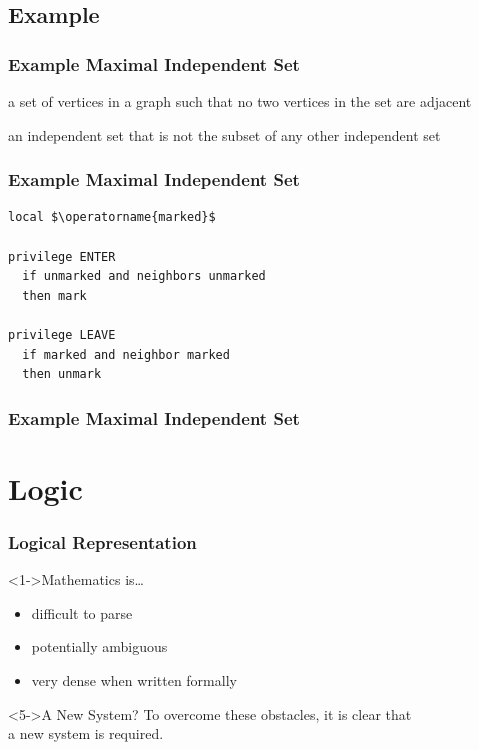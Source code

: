 \documentclass[
]{beamer}
\begin{document}
\subsection{Example}
\begin{frame}[fragile]
  \frametitle{Example \Dash Maximal Independent Set}
  \begin{description}[<+->]
  \item[independent set] a set of vertices in a graph such that no two
    vertices in the set are adjacent
  \item[maximal independent set] an independent set that is not the
    subset of any other independent set
  \end{description}    
\end{frame}
\begin{frame}[fragile]
  \frametitle{Example \Dash Maximal Independent Set}
\begin{lstlisting}[language=ssa]
local $\operatorname{marked}$

privilege ENTER
  if unmarked and neighbors unmarked
  then mark

privilege LEAVE
  if marked and neighbor marked
  then unmark
\end{lstlisting}
\end{frame}
\begin{frame}
  \frametitle{Example \Dash Maximal Independent Set}
  \centering
\end{frame}

\section{Logic}
\begin{frame}
  \frametitle{Logical Representation}
  \begin{block}<1->{Mathematics is\dots}
    \begin{itemize}
    \item<1-> difficult to parse
    \item<2-> potentially ambiguous
    \item<3-> very dense when written formally
    \end{itemize}
  \end{block}
  \begin{block}<5->{A New System?}
    To overcome these obstacles, it is clear that \\ a new system is required.
  \end{block}
\end{frame}
\end{document}
